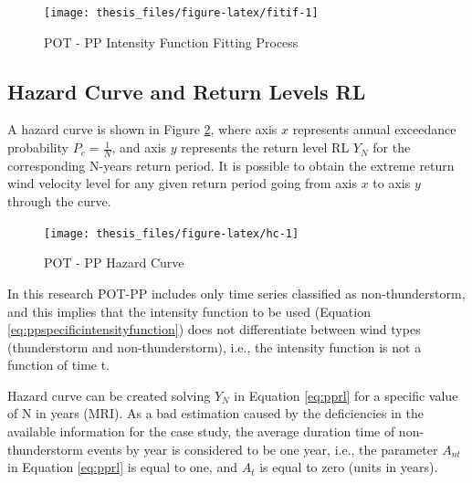 \documentclass[12pt,oneside]{reedthesis}
\begin{document}
\footnotesize
\begin{figure}

{\centering \texttt{[image: thesis\_files/figure-latex/fitif-1]} 

}

\caption{POT - PP Intensity Function Fitting Process}\label{fig:fitif}
\end{figure}
\normalsize

\hypertarget{hazard-curve-and-return-levels-rl}{%
\subsection{Hazard Curve and Return Levels RL}\label{hazard-curve-and-return-levels-rl}}

A hazard curve is shown in Figure \ref{fig:hc}, where axis \(x\) represents annual exceedance probability \(P_e = \frac{1}{N}\), and axis \(y\) represents the return level RL \(Y_N\) for the corresponding N-years return period. It is possible to obtain the extreme return wind velocity level for any given return period going from axis \(x\) to axis \(y\) through the curve.

\footnotesize
\begin{figure}

{\centering \texttt{[image: thesis\_files/figure-latex/hc-1]} 

}

\caption{POT - PP Hazard Curve}\label{fig:hc}
\end{figure}
\normalsize

In this research POT-PP includes only time series classified as non-thunderstorm, and this implies that the intensity function to be used (Equation \eqref{eq:ppspecificintensityfunction}) does not differentiate between wind types (thunderstorm and non-thunderstorm), i.e., the intensity function is not a function of time t.

Hazard curve can be created solving \(Y_N\) in Equation \eqref{eq:pprl} for a specific value of N in years (MRI). As a bad estimation caused by the deficiencies in the available information for the case study, the average duration time of non-thunderstorm events by year is considered to be one year, i.e., the parameter \(A_{nt}\) in Equation \eqref{eq:pprl} is equal to one, and \(A_t\) is equal to zero (units in years).
\end{document}
